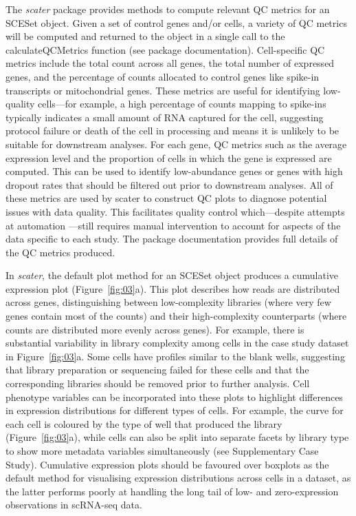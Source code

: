 \documentclass{bioinfo}
\begin{document}
The \emph{scater} package provides methods to compute relevant QC metrics for an SCESet object. Given a set of control genes and/or cells, a variety of QC metrics will be computed and returned to the object in a single call to the calculateQCMetrics function (see package documentation). Cell-specific QC metrics include the total count across all genes, the total number of expressed genes, and the percentage of counts allocated to control genes like spike-in transcripts or mitochondrial genes. These metrics are useful for identifying low-quality cells---for example, a high percentage of counts mapping to spike-ins typically indicates a small amount of RNA captured for the cell, suggesting protocol failure or death of the cell in processing and means it is unlikely to be suitable for downstream analyses. For each gene, QC metrics such as the average expression level and the proportion of cells in which the gene is expressed are computed. This can be used to identify low-abundance genes or genes with high dropout rates that should be filtered out prior to downstream analyses. All of these metrics are used by scater to construct QC plots to diagnose potential issues with data quality. This facilitates quality control which---despite attempts at automation \citep{Ilicic2016-dm}---still requires manual intervention to account for aspects of the data specific to each study. The package documentation provides full details of the QC metrics produced.

In \emph{scater}, the default plot method for an SCESet object produces
a cumulative expression plot (Figure~\ref{fig:03}a). This plot describes how reads are distributed across genes, distinguishing between low-complexity libraries (where very few genes contain most of the counts) and their high-complexity counterparts (where counts are distributed more evenly across genes).
For example, there is substantial variability in library complexity among cells in the case study dataset in Figure~\ref{fig:03}a. Some cells have profiles similar to the blank wells,
suggesting that library preparation or sequencing failed for these cells and
that the corresponding libraries should be removed prior to further analysis.
Cell phenotype variables can be incorporated into these plots to highlight
differences in expression distributions for different types of cells. For
example, the curve for each cell is coloured by the type of well that produced
the library (Figure~\ref{fig:03}a), while cells can also be split into separate
facets by library type to show more metadata variables simultaneously (see
Supplementary Case Study). Cumulative expression plots should be favoured over
boxplots as the default method for visualising expression distributions across
cells in a dataset, as the latter performs poorly at handling the long tail of
low- and zero-expression observations in scRNA-seq data.
\end{document}
